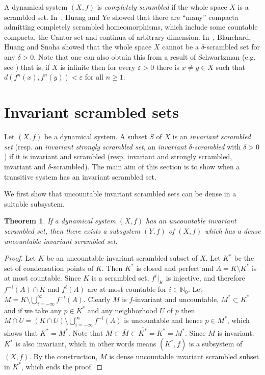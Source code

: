 \documentclass[reqno,a4paper,12pt]{amsart}
\newtheorem{thm}{Theorem}[section]
\theoremstyle{definition}
\numberwithin{equation}{section}
\begin{document}
A dynamical system $(X,f)$ is \emph{completely scrambled} if the whole space $X$ is a scrambled set.
In~\cite{HYCS}, Huang and Ye showed that there are ``many'' compacta admitting completely scrambled
homeomorphisms, which include some countable compacta,
the Cantor set and continua of arbitrary dimension.
In~\cite{BHS},  Blanchard, Huang and Snoha showed
that the whole space $X$ cannot be a $\delta$-scrambled  set for any $\delta>0$.
Note that one can also obtain this from a result of Schwartzman (e.g. see \cite[Theorem~2.1]{King}) that is,
if $X$ is infinite then for every ${\varepsilon}>0$ there is $x\neq y\in X$ such that $d(f^n(x),f^n(y))<{\varepsilon}$ for all $n\geq 1$.

\section{Invariant scrambled sets}
Let $(X,f)$ be a dynamical system.
A subset $S$ of $X$ is an \emph{invariant scrambled set} (resp. an \emph{invariant strongly scrambled set},
an \emph{invariant $\delta$-scrambled} with $\delta>0$)
if it is invariant and  scrambled (resp. invariant and  strongly scrambled, invariant and $\delta$-scrambled).
The main aim of this section is to show when a transitive  system has an invariant scrambled set.

We first show that uncountable invariant scrambled sets can be dense in a suitable subsystem.
\begin{thm}\label{thm:un-iss}
If a dynamical system $(X,f)$ has an uncountable invariant scrambled set,
then there exists a subsystem $(Y,f)$ of $(X,f)$ which has a dense uncountable invariant scrambled set.
\end{thm}
\begin{proof}
Let $K$ be an uncountable invariant scrambled subset of $X$.
Let $K^*$ be the set of condensation points of $K$.
Then $K^*$ is closed and perfect and $A=K\setminus K^*$ is at most countable.
Since $K$ is a scrambled set, $f^i|_K$ is injective,
and therefore $f^{-i}(A)\cap K$ and $f^i(A)$ are at most countable for $i\in \mathbb{N}_0$.
Let $M=K\setminus \bigcup_{i=-\infty}^\infty f^{-i}(A)$. Clearly $M$ is $f$-invariant and uncountable,
$M^*\subset K^*$ and if we take any $p\in K^*$ and any neighborhood $U$ of $p$
then $M\cap U=(K\cap U) \setminus \bigcup_{i=-\infty}^\infty f^{-i}(A)$ is uncountable and hence $p\in M^*$,
which shows that $K^*=M^*$.
Note that $M\subset \overline{M}\subset \overline{K^*}=K^*=M^*$.
Since $M$ is invariant, $K^*$ is also invariant, which in other words means $(K^*,f)$ is a subsystem of $(X,f)$.
By the construction, $M$ is dense uncountable invariant scrambled subset in $K^*$,
which ends the proof.
\end{proof}
\end{document}
